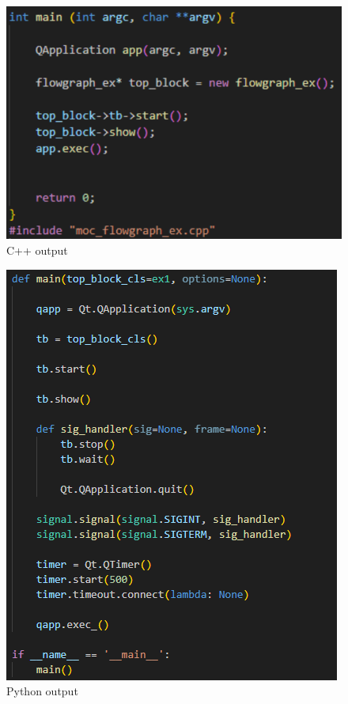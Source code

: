 \begin{frame}
\begin{columns}
\begin{column}{0.5\textwidth}
 \begin{figure}
        \centering
        \includegraphics[width=0.5\linewidth]{img/c++.png}
        \caption{C++ output}
        \label{fig:enter-label}
    \end{figure}
                \begin{figure}
        \centering
        \includegraphics[width=0.3\linewidth]{img/python.png}
        \caption{Python output}
        \label{fig:enter-label}
    \end{figure}
        \end{column}
    \end{columns}
	
\end{frame}



    
